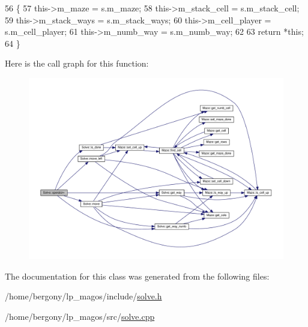 \begin{DoxyCode}
56         \{
57             this->m\_maze = s.m\_maze;
58             this->m\_stack\_cell = s.m\_stack\_cell;
59             this->m\_stack\_ways = s.m\_stack\_ways;
60             this->m\_cell\_player = s.m\_cell\_player;
61             this->m\_numb\_way = s.m\_numb\_way;
62 
63             \textcolor{keywordflow}{return} *\textcolor{keyword}{this};
64         \}
\end{DoxyCode}
Here is the call graph for this function\+:\nopagebreak
\begin{figure}[H]
\begin{center}
\leavevmode
\includegraphics[width=350pt]{classSolve_a2c0330bee4d1cafc5b3c7d5f7ba72697_cgraph}
\end{center}
\end{figure}


The documentation for this class was generated from the following files\+:\begin{DoxyCompactItemize}
\item 
/home/bergony/lp\+\_\+magos/include/\hyperlink{solve_8h}{solve.\+h}\item 
/home/bergony/lp\+\_\+magos/src/\hyperlink{solve_8cpp}{solve.\+cpp}\end{DoxyCompactItemize}

